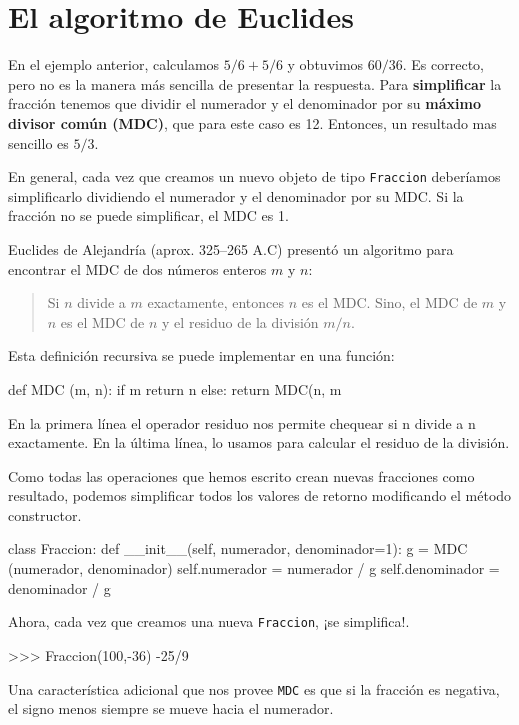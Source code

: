 \section{El algoritmo de Euclides}

  

En el ejemplo anterior, calculamos $5/6+5/6$ y obtuvimos $60/36$.
Es correcto, pero no es la manera más sencilla de presentar la respuesta.
Para \textbf{simplificar} la fracción tenemos que dividir el numerador
y el denominador por su \textbf{máximo divisor común (MDC)}, que para
este caso es 12. Entonces, un resultado mas sencillo es $5/3$.

En general, cada vez que creamos un nuevo objeto de tipo \texttt{Fraccion}
deberíamos simplificarlo dividiendo el numerador y el denominador
por su MDC. Si la fracción no se puede simplificar, el MDC es 1.

Euclides de Alejandría (aprox. 325–265 A.C) presentó un algoritmo
para encontrar el MDC de dos números enteros $m$ y $n$:
\begin{quote}
Si $n$ divide a $m$ exactamente, entonces $n$ es el MDC. Sino,
el MDC de $m$ y $n$ es el MDC de $n$ y el residuo de la división
$m/n$. 
\end{quote}
Esta definición recursiva se puede implementar en una función:

\begin{pythoncode}
def MDC (m, n):
  if m %
    return n
  else:
    return MDC(n, m%
\end{pythoncode}
 En la primera línea el operador residuo nos permite chequear si n
divide a n exactamente. En la última línea, lo usamos para calcular
el residuo de la división.

Como todas las operaciones que hemos escrito crean nuevas fracciones
como resultado, podemos simplificar todos los valores de retorno modificando
el método constructor.

\begin{pythoncode}
class Fraccion:
  def __init__(self, numerador, denominador=1):
    g = MDC (numerador, denominador)
    self.numerador   =   numerador / g
    self.denominador = denominador / g
\end{pythoncode}
 Ahora, cada vez que creamos una nueva \texttt{Fraccion}, ¡se simplifica!.

\begin{pythoncode}
>>> Fraccion(100,-36)
-25/9
\end{pythoncode}
 Una característica adicional que nos provee \texttt{MDC} es que si
la fracción es negativa, el signo menos siempre se mueve hacia el
numerador.

